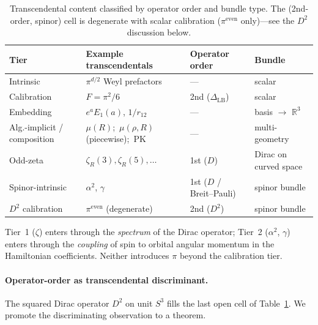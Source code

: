 \documentclass[aps,pra,twocolumn,superscriptaddress,longbibliography]{revtex4-2}
\begin{document}
\begin{table}[h]
\caption{Transcendental content classified by operator order and bundle
  type.  The (2nd-order, spinor) cell is degenerate with scalar
  calibration ($\pi^{\mathrm{even}}$ only)---see the $D^2$ discussion
  below.}
\label{tab:bundle_operator_tiers}
\begin{ruledtabular}
\begin{tabular}{llll}
  Tier & Example transcendentals & Operator order & Bundle \\
  \hline
  Intrinsic         & $\pi^{d/2}$ Weyl prefactors & --- & scalar \\
  Calibration       & $F = \pi^2/6$
                    & 2nd ($\Delta_{\text{LB}}$)
                    & scalar \\
  Embedding         & $e^a E_1(a)$, $1/r_{12}$
                    & ---
                    & basis $\to$ $\mathbb{R}^3$ \\
  Alg.-implicit / composition & $\mu(R)$;\ $\mu(\rho,R)$ (piecewise);\ PK
                    & ---
                    & multi-geometry \\
  Odd-zeta          & $\zeta_R(3), \zeta_R(5), \dots$
                    & 1st ($D$)
                    & Dirac on curved space \\
  Spinor-intrinsic  & $\alpha^2$, $\gamma$
                    & 1st ($D$ / Breit--Pauli)
                    & spinor bundle \\
  $D^2$ calibration & $\pi^{\text{even}}$ (degenerate)
                    & 2nd ($D^2$)
                    & spinor bundle \\
\end{tabular}
\end{ruledtabular}
\end{table}

\noindent Tier~1 ($\zeta$) enters through the \emph{spectrum} of the
Dirac operator; Tier~2 ($\alpha^2$, $\gamma$) enters through the
\emph{coupling} of spin to orbital angular momentum in the Hamiltonian
coefficients.  Neither introduces $\pi$ beyond the calibration tier.

\paragraph{Operator-order as transcendental discriminant.}
The squared Dirac operator $D^2$ on unit $S^3$ fills the last open
cell of Table~\ref{tab:bundle_operator_tiers}.  We promote the
discriminating observation to a theorem.
\end{document}
